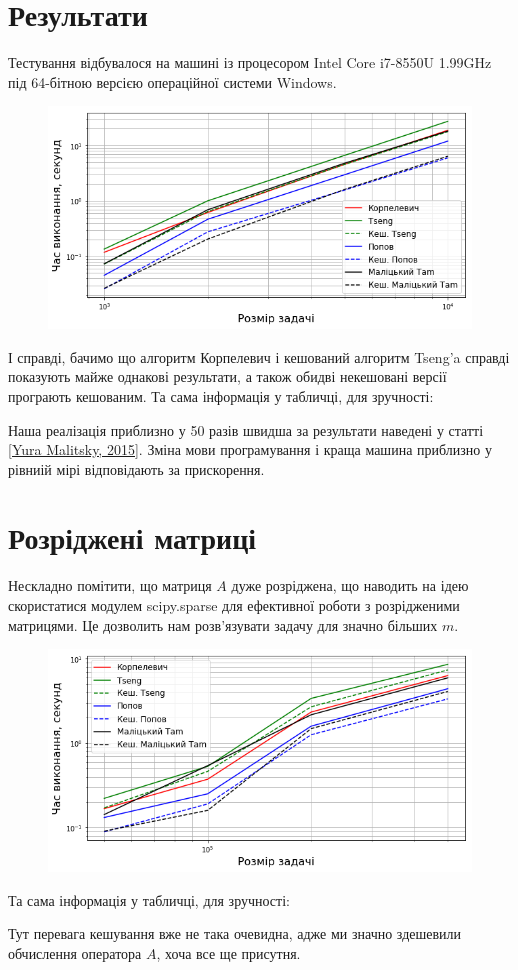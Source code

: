 \section{Результати}

Тестування відбувалося на машині із процесором Intel Core i7-8550U 1.99GHz під 64-бітною версією операційної системи Windows.

\begin{figure}[H]
    \centering
    \includegraphics[width=.75\textwidth]{img/1/time.png}
\end{figure}

І справді, бачимо що алгоритм Корпелевич і кешований алгоритм Tseng'a справді показують майже однакові результати, а також обидві некешовані версії програють кешованим. Та сама інформація у табличці, для зручності:



\begin{remark}
    Наша реалізація приблизно у 50 разів швидша за результати наведені у статті \href{https://arxiv.org/abs/1502.04968v1}{[Yura Malitsky, 2015]}. Зміна мови програмування і краща машина приблизно у рівниій мірі відповідають за прискорення.
\end{remark}



\section{Розріджені матриці}

Нескладно помітити, що матриця $A$ дуже розріджена, що наводить на ідею скористатися модулем scipy.sparse для ефективної роботи з розрідженими матрицями. Це дозволить нам розв'язувати задачу для значно більших $m$.

\begin{figure}[H]
    \centering
    \includegraphics[width=.75\textwidth]{img/1/sparse/time.png}
\end{figure}

Та сама інформація у табличці, для зручності:



\begin{remark}
    Тут перевага кешування вже не така очевидна, адже ми значно здешевили обчислення оператора $A$, хоча все ще присутня.
\end{remark}


